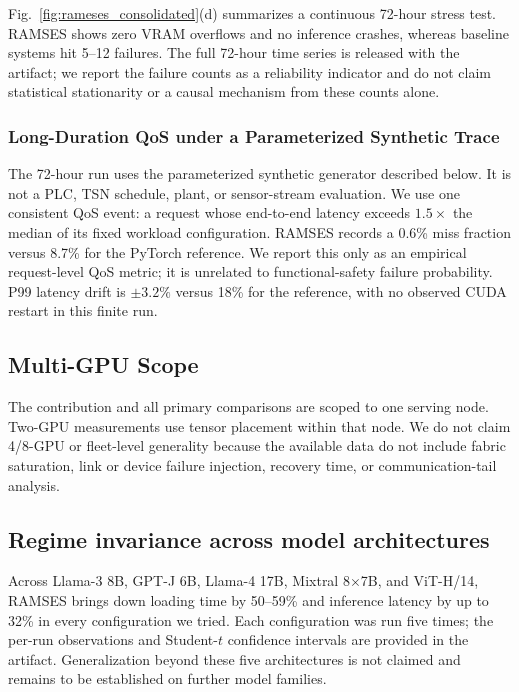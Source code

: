 Fig.~\ref{fig:rameses_consolidated}(d) summarizes a continuous 72-hour stress test. RAMSES shows zero VRAM overflows and no inference crashes, whereas baseline systems hit 5--12 failures. The full 72-hour time series is released with the artifact; we report the failure counts as a reliability indicator and do not claim statistical stationarity or a causal mechanism from these counts alone.

\subsubsection{Long-Duration QoS under a Parameterized Synthetic Trace}
The 72-hour run uses the parameterized synthetic generator described below.  It is not a PLC, TSN schedule, plant, or sensor-stream evaluation.  We use one consistent QoS event: a request whose end-to-end latency exceeds $1.5\times$ the median of its fixed workload configuration.  RAMSES records a 0.6\% miss fraction versus 8.7\% for the PyTorch reference.  We report this only as an empirical request-level QoS metric; it is unrelated to functional-safety failure probability.  P99 latency drift is $\pm3.2\%$ versus 18\% for the reference, with no observed CUDA restart in this finite run.

\subsection{Multi-GPU Scope}
The contribution and all primary comparisons are scoped to one serving node.  Two-GPU measurements use tensor placement within that node.  We do not claim 4/8-GPU or fleet-level generality because the available data do not include fabric saturation, link or device failure injection, recovery time, or communication-tail analysis.

\subsection{Regime invariance across model architectures}

Across Llama-3 8B, GPT-J 6B, Llama-4 17B, Mixtral 8$\times$7B, and ViT-H/14, RAMSES brings down loading time by 50--59\% and inference latency by up to 32\% in every configuration we tried.
Each configuration was run five times; the per-run observations and Student-$t$ confidence intervals are provided in the artifact. Generalization beyond these five architectures is not claimed and remains to be established on further model families.

